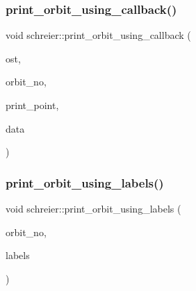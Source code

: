 \subsubsection{\texorpdfstring{print\+\_\+orbit\+\_\+using\+\_\+callback()}{print\_orbit\_using\_callback()}}
{\footnotesize\ttfamily void schreier\+::print\+\_\+orbit\+\_\+using\+\_\+callback (\begin{DoxyParamCaption}\item[{ostream \&}]{ost,  }\item[{\mbox{\hyperlink{galois_8h_a09fddde158a3a20bd2dcadb609de11dc}{I\+NT}}}]{orbit\+\_\+no,  }\item[{void($\ast$)(ostream \&ost, \mbox{\hyperlink{galois_8h_a09fddde158a3a20bd2dcadb609de11dc}{I\+NT}} \mbox{\hyperlink{clique__finder_8_c_aec1f1a2b30fdca8844c2932384483145}{pt}}, void $\ast$data)}]{print\+\_\+point,  }\item[{void $\ast$}]{data }\end{DoxyParamCaption})}

\mbox{\label{classschreier_ac8caf93e9b865d690e01b3faf74d0200}} 
\subsubsection{\texorpdfstring{print\+\_\+orbit\+\_\+using\+\_\+labels()}{print\_orbit\_using\_labels()}\hspace{0.1cm}{\footnotesize\ttfamily [1/2]}}
{\footnotesize\ttfamily void schreier\+::print\+\_\+orbit\+\_\+using\+\_\+labels (\begin{DoxyParamCaption}\item[{\mbox{\hyperlink{galois_8h_a09fddde158a3a20bd2dcadb609de11dc}{I\+NT}}}]{orbit\+\_\+no,  }\item[{\mbox{\hyperlink{galois_8h_a09fddde158a3a20bd2dcadb609de11dc}{I\+NT}} $\ast$}]{labels }\end{DoxyParamCaption})}

\mbox{\label{classschreier_a6d9debe3b65c697b510549aa198b7bc6}} 
